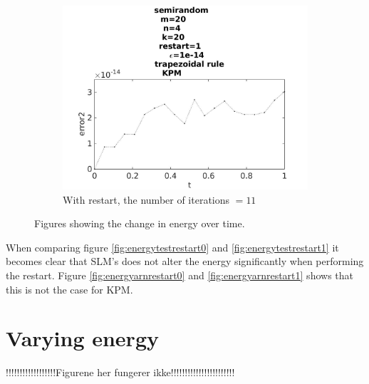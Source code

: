 \begin{figure}[H]
\begin{subfigure}[b]{0.3\textwidth}
                \includegraphics[width=\textwidth]{../MATLAB/fig/errorarnrestart1.jpg}
                \caption{ With restart, the number of iterations $ = 11$ }
                \label{fig:errorarnrestart1}
        \end{subfigure}
        \caption{ Figures showing the change in energy over time. }
        \label{fig:energyarnrestart}
\end{figure}

When comparing figure \ref{fig:energytestrestart0} and \ref{fig:energytestrestart1} it becomes clear that SLM's does not alter the energy significantly when performing the restart. Figure \ref{fig:energyarnrestart0} and \ref{fig:energyarnrestart1} shows that this is not the case for KPM.\\


\section{Varying energy}
!!!!!!!!!!!!!!!!!!Figurene her fungerer ikke!!!!!!!!!!!!!!!!!!!!!!!\\

